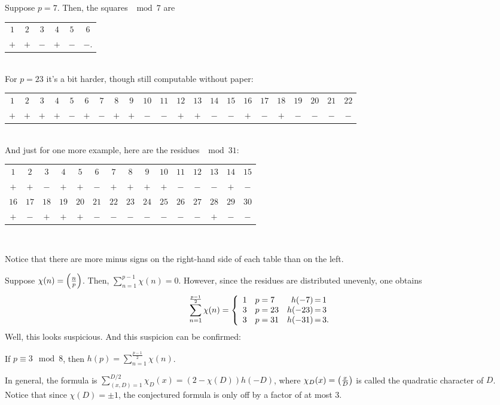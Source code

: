 Suppose $p = 7$. Then, the squares $\mod 7$ are
\begin{tabular}{c c c|c c c}
$1$&$2$&$3$&$4$&$5$&$6$\\
$+$&$+$&$-$&$+$&$-$&$-$.
\end{tabular}\\
For $p = 23$ it's a bit harder, though still computable without paper:

\begin{tabular}{c c c c c c c c c c c|c c c c c c c c c c c}
$1$&$2$&$3$&$4$&$5$&$6$&$7$&$8$&$9$&$10$&$11$&$12$&$13$&$14$&$15$&$16$&$17$&$18$&$19$&$20$&$21$&$22$\\
$+$&$+$&$+$&$+$&$-$&$+$&$-$&$+$&$+$&$-$&$-$&
$+$&$+$&$-$&$-$&$+$&$-$&$+$&$-$&$-$&$-$&$-$
\end{tabular}\\
And just for one more example, here are the residues $\mod 31$:

\begin{center}
\begin{tabular}
{c c c c c c c c c c c c c c c}
$1$&$2$&$3$&$4$&$5$&$6$&$7$&$8$&$9$&$10$&$11$&$12$&$13$&$14$&$15$\\
$+$&$+$&$-$&$+$&$+$&$-$&$+$&$+$&$+$&$+$&$-$&$-$&$-$&$+$&$-$\\
\hline
$16$&$17$&$18$&$19$&$20$&$21$&$22$&$23$&$24$&$25$&$26$&$27$&$28$&$29$&$30$\\
$+$&$-$&$+$&$+$&$+$&$-$&$-$&$-$&$-$&$-$&$-$&$-$&$+$&$-$&$-$
\end{tabular}\\
\end{center}

Notice that there are more minus signs on the right-hand side of each table than on the left.

Suppose $\chi(n) = \left(\frac{n}{p}\right)$. Then, $\sum_{n=1}^{p-1}\chi(n) = 0$. However, since the residues are distributed unevenly, one obtains
\[
\sum_{n=1}^{\frac{p-1}{2}} \chi(n) =\left\{
\begin{array}{c l r @{\,=\,} l}
1 & p=7 & h(-7)&1\\
3 & p=23 & h(-23)&3\\
3 & p = 31& h(-31)&3.
\end{array}\right.
\]
Well, this looks suspicious. And this suspicion can be confirmed:
\begin{thm}
\label{halfsum}
If $p\equiv 3\mod 8$, then $h(p) = \displaystyle{\sum_{n=1}^{\frac{p-1}{2}}} \chi(n)$.
\end{thm}
In general, the formula is $\sum_{(x,D) = 1}^{D/2}\chi_D(x) = (2-\chi(D))h(-D)$, where $\chi_D(x) = \left(\frac{x}{D}\right)$ is called the quadratic character of $D$. Notice that since $\chi(D) = \pm 1$, the conjectured formula is only off by a factor of at most 3.

